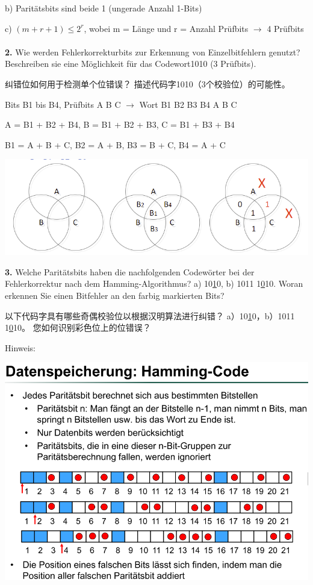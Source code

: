 \documentclass[fleqn]{article}
\begin{document}
b) Paritätsbits sind beide 1 (ungerade Anzahl 1-Bits)

c) $(m+r+1)\leq 2^r$, wobei m = Länge und r = Anzahl Prüfbits $\rightarrow$ 4 Prüfbits
\\
\\
\noindent\textbf{2.} Wie werden Fehlerkorrekturbits zur Erkennung von Einzelbitfehlern genutzt? Beschreiben sie eine Möglichkeit für das Codewort1010 (3 Prüfbits).

纠错位如何用于检测单个位错误？ 描述代码字1010（3个校验位）的可能性。

Bits B1 bis B4, Prüfbits A B C $\rightarrow$ Wort B1 B2 B3 B4 A B C

A = B1 + B2 + B4, B = B1 + B2 + B3, C = B1 + B3 + B4

B1 = A + B + C, B2 = A + B, B3 = B + C, B4 = A + C 

\begin{center}
    \includegraphics[scale=0.5]{7.png}
\end{center}

\noindent\textbf{3.} Welche Paritätsbits haben die nachfolgenden Codewörter bei der Fehlerkorrektur nach dem Hamming-Algorithmus?
a) 10\underline{1}0, b) 1011 1\underline{0}10. Woran erkennen Sie einen Bitfehler an den farbig markierten Bits?

以下代码字具有哪些奇偶校验位以根据汉明算法进行纠错？
a）10\underline{1}0，b）1011 1\underline{0}10。 您如何识别彩色位上的位错误？

\noindent Hinweis:
\begin{center}
    \includegraphics[scale=0.5]{8.png}
\end{center}
\end{document}
